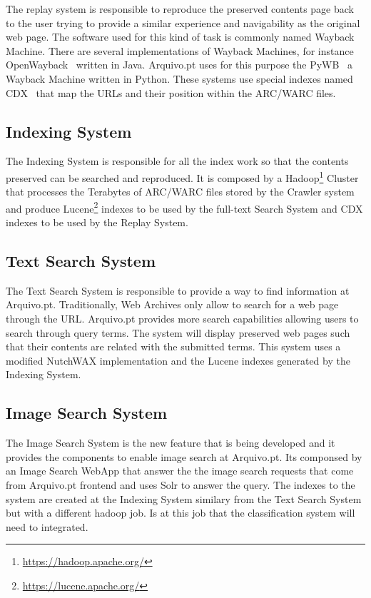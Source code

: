 The replay system is responsible to reproduce the preserved contents page back to the user trying to provide a similar experience and navigability as the original web page. The software used for this kind of task is commonly named Wayback Machine. There are several implementations of Wayback Machines, for instance OpenWayback~\cite{openwayback} written in Java. Arquivo.pt uses for this purpose the PyWB~\cite{pywb} a Wayback Machine written in Python. These systems use special indexes named CDX~\cite{cdxpage} that map the URLs and their position within the ARC/WARC files. %

\subsection{Indexing System}

The Indexing System is responsible for all the index work so that the contents preserved can be searched and reproduced. It is composed by a Hadoop\footnote{\url{https://hadoop.apache.org/}} Cluster that processes the Terabytes of ARC/WARC files stored by the Crawler system and produce Lucene\footnote{\url{https://lucene.apache.org/}} indexes to be used by the full-text Search System and CDX indexes to be used by the Replay System.

\subsection{Text Search System}

The Text Search System is responsible to provide a way to find information at Arquivo.pt. Traditionally, Web Archives only allow to search for a web page through the URL. Arquivo.pt provides more search capabilities allowing users to search through query terms. The system will display preserved web pages such that their contents are related with the submitted terms. This system uses a modified NutchWAX\cite{nutchwax} implementation and the Lucene indexes generated by the Indexing System.


\subsection{Image Search System}

The Image Search System is the new feature that is being developed and it provides the components to enable image search at Arquivo.pt. Its componsed by an Image Search WebApp that answer the the image search requests that come from Arquivo.pt frontend and uses Solr to answer the query. The indexes to the system are created at the Indexing System similary from the Text Search System but with a different hadoop job. Is at this job that the classification system will need to integrated.


